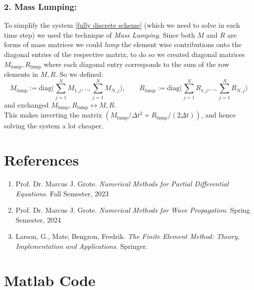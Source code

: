 \documentclass{article}
\begin{document}
\subsubsection*{2. Mass Lumping:}
To simplify the system \eqref{fully discrete scheme} (which we need to solve in each time step) we used the technique of \emph{Mass Lumping}. Since both $M$ and $R$ are forms of mass matrices we could \emph{lump} the element wise contributions onto the diagonal entries of the respective matrix, to do so we created diagonal matrices $M_{\text{lump}},R_{\text{lump}}$ where each diagonal entry corresponds to the sum of the row elements in $M,R$. So we defined:
\[
	M_{\text{lump}} := \text{diag}\Big(\sum_{j=1}^N M_{1,j},..,
	\sum_{j=1}^N M_{N,j}\Big), \qquad
	R_{\text{lump}} := \text{diag}\Big(\sum_{j=1}^N R_{1,j},..,
	\sum_{j=1}^N R_{N,j}\Big)	
\]
and exchanged $M_{\text{lump}},R_{\text{lump}} \leftrightarrow M,R$. \\
This makes inverting the matrix $(M_{\text{lump}}/\Delta t^2 + R_{\text{lump}}/(2 \Delta t))$, and hence solving the system a lot cheaper.

\newpage
\section{References}
\begin{enumerate}
\item Prof. Dr. Marcus J. Grote. \textit{Numerical Methods for Partial Differential Equations}. Fall Semester, 2023
\item Prof. Dr. Marcus J. Grote. \textit{Numerical Methods for Wave Propagation}. Spring Semester, 2024
\item Larson, G., Mats; Bengzon, Fredrik. \textit{The Finite Element Method: Theory, Implementation and Applications}. Springer.
\end{enumerate}

\newpage
\section{Matlab Code}
\end{document}
